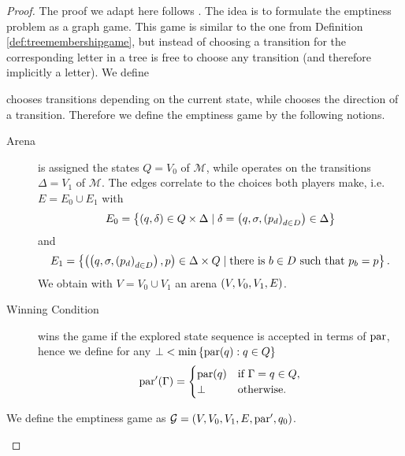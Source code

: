 \begin{proof}
  The proof we adapt here follows 
  \cite[Proof of Theorem 23]{ParityGamesPosDet}. The idea is to formulate the
  emptiness problem as a graph game. This game is similar to the one from
  Definition \ref{def:treemembershipgame}, but instead of choosing a transition
  for the corresponding letter in a tree \eve{} is free to choose any
  transition (and therefore implicitly a letter). We define
  \begin{definition}
    \eve{} chooses transitions depending on the current state, while
    \adam{} chooses the direction of a transition. Therefore
    we define the emptiness game by the following notions.
    \begin{description}
      \item [Arena] \eve{} is assigned the states $Q = V_{0}$ of 
        $\mathcal{M}$, while \adam{} operates on the transitions 
        $\Delta = V_{1}$ of $\mathcal{M}$. The edges correlate to the choices
        both players make, i.e. $E = E_{0}\cup E_{1}$ with
        \begin{equation*}
          E_{0} = \left\{\left(q, \delta\right)\in Q\times\Delta\mid\delta = 
            \left(q, \sigma, \left(p_{d}\right)_{d\in D}\right)\in\Delta\right\}
        \end{equation*}
        and
        \begin{equation*}
          E_{1} = \left\{\left(\left(q, \sigma, \left(p_{d}\right)_{d\in D}\right), p\right)
            \in\Delta\times Q\mid\text{there is }b\in D
            \text{ such that }p_{b} = p
          \right\}.
        \end{equation*}
        We obtain with $V = V_{0}\cup V_{1}$ an arena 
        $\left(V, V_{0}, V_{1}, E\right)$.
      \item [Winning Condition] \eve{} wins the game if the explored state 
        sequence is accepted in terms of $\operatorname{par}$, hence we define for any
        $\bot < \min\left\{\operatorname{par}(q):q\in Q\right\}$
        \begin{equation*}
          \operatorname{par}'(\Gamma) = \begin{cases}
            \operatorname{par}(q) &\text{if }\Gamma = q\in Q,\\
            \bot       &\text{otherwise}.
          \end{cases}
        \end{equation*}
    \end{description}
    We define the emptiness game as 
    $\mathcal{G} = \left(V, V_{0}, V_{1}, E, \operatorname{par}', q_{0}\right)$.
    \label{def:treeemptinessgame}

\end{definition}
\end{proof}
